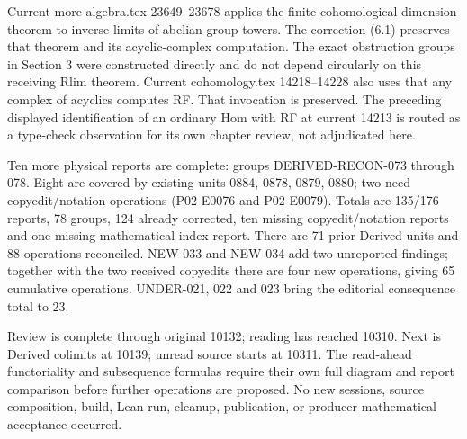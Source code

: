 Current more-algebra.tex 23649–\allowbreak{}23678 applies the finite cohomological dimension theorem to inverse limits of abelian-group towers. The correction (6.1)\allowbreak{} preserves that theorem and its acyclic-complex computation. The exact obstruction groups in Section 3 were constructed directly and do not depend circularly on this receiving Rlim theorem. Current cohomology.tex 14218–\allowbreak{}14228 also uses that any complex of acyclics computes RF. That invocation is preserved. The preceding displayed identification of an ordinary Hom with RΓ at current 14213 is routed as a type-check observation for its own chapter review,\allowbreak{} not adjudicated here.

Ten more physical reports are complete:\allowbreak{} groups DERIVED-RECON-073 through 078. Eight are covered by existing units 0884,\allowbreak{} 0878,\allowbreak{} 0879,\allowbreak{} 0880; two need copyedit/\allowbreak{}notation operations (P02-E0076 and P02-E0079)\allowbreak{}. Totals are 135/\allowbreak{}176 reports,\allowbreak{} 78 groups,\allowbreak{} 124 already corrected,\allowbreak{} ten missing copyedit/\allowbreak{}notation reports and one missing mathematical-index report. There are 71 prior Derived units and 88 operations reconciled. NEW-033 and NEW-034 add two unreported findings; together with the two received copyedits there are four new operations,\allowbreak{} giving 65 cumulative operations. UNDER-021,\allowbreak{} 022 and 023 bring the editorial consequence total to 23.

Review is complete through original 10132; reading has reached 10310. Next is Derived colimits at 10139; unread source starts at 10311. The read-ahead functoriality and subsequence formulas require their own full diagram and report comparison before further operations are proposed. No new sessions,\allowbreak{} source composition,\allowbreak{} build,\allowbreak{} Lean run,\allowbreak{} cleanup,\allowbreak{} publication,\allowbreak{} or producer mathematical acceptance occurred.
